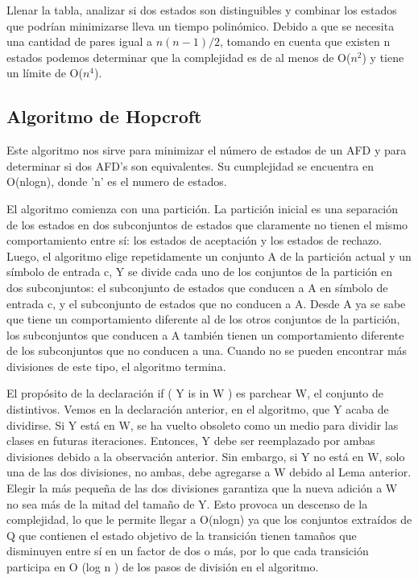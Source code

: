 \documentclass[12pt]{article}
\begin{document}
Llenar la tabla, analizar si dos estados son distinguibles y combinar los estados que podrían minimizarse lleva un tiempo polinómico. Debido a que se necesita una cantidad de pares igual a $n(n-1)/2$, tomando en cuenta que existen n estados podemos determinar que la complejidad es de al menos de O($n^2$) y tiene un l\'imite de O($n^4$).
\newline

\subsection{Algoritmo de Hopcroft}
Este algoritmo nos sirve para minimizar el número de estados de un AFD y para determinar si dos AFD's son equivalentes. Su cumplejidad se encuentra en O(nlogn), donde 'n' es el numero de estados.

El algoritmo comienza con una partición. La partición inicial es una separación de los estados en dos subconjuntos de estados que claramente no tienen el mismo comportamiento entre sí: los estados de aceptación y los estados de rechazo. Luego, el algoritmo elige repetidamente un conjunto A de la partición actual y un símbolo de entrada c, Y se divide cada uno de los conjuntos de la partición en dos subconjuntos: el subconjunto de estados que conducen a A en símbolo de entrada c, y el subconjunto de estados que no conducen a A. Desde A ya se sabe que tiene un comportamiento diferente al de los otros conjuntos de la partición, los subconjuntos que conducen a A también tienen un comportamiento diferente de los subconjuntos que no conducen a una. Cuando no se pueden encontrar más divisiones de este tipo, el algoritmo termina.

El propósito de la declaración if ( Y is in W ) es parchear W, el conjunto de distintivos. Vemos en la declaración anterior, en el algoritmo, que Y acaba de dividirse. Si Y está en W, se ha vuelto obsoleto como un medio para dividir las clases en futuras iteraciones. Entonces, Y debe ser reemplazado por ambas divisiones debido a la observación anterior. Sin embargo, si Y no está en W, solo una de las dos divisiones, no ambas, debe agregarse a W debido al Lema anterior. Elegir la más pequeña de las dos divisiones garantiza que la nueva adición a W no sea más de la mitad del tamaño de Y. Esto provoca un descenso de la complejidad, lo que le permite llegar a O(nlogn) ya que los conjuntos extraídos de Q que contienen el estado objetivo de la transición tienen tamaños que disminuyen entre sí en un factor de dos o más, por lo que cada transición participa en O (log n ) de los pasos de división en el algoritmo.
\end{document}
